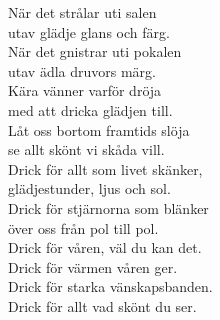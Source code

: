 \documentclass[a6paper, 10pt, twoside]{article}
\begin{document}
\noindent
{}
\small
\begin{center}
\end{center}
\begin{lyrics}
När det strålar uti salen\\
utav glädje glans och färg.\\
När det gnistrar uti pokalen\\
utav ädla druvors märg.
\vspace{5pt}\\
Kära vänner varför dröja\\
med att dricka glädjen till.\\
Låt oss bortom framtids slöja\\
se allt skönt vi skåda vill.
\vspace{5pt}\\
Drick för allt som livet skänker,\\
glädjestunder, ljus och sol.\\
Drick för stjärnorna som blänker\\
över oss från pol till pol.
\vspace{5pt}\\
Drick för våren, väl du kan det.\\
Drick för värmen våren ger.\\
Drick för starka vänskapsbanden.\\
Drick för allt vad skönt du ser.
\end{lyrics}
\end{document}
